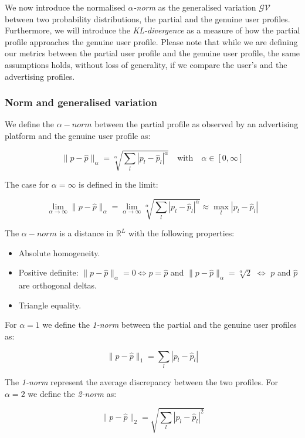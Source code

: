 We now introduce the normalised \emph{$\alpha$-norm} as the generalised variation $\mathcal{GV}$ between two probability distributions, the partial and the genuine user profiles. Furthermore, we will introduce the \emph{KL-divergence} as a measure of how the partial profile approaches the genuine user profile. Please note that while we are defining our metrics between the partial user profile and the genuine user profile, the same assumptions holds, without loss of generality, if we compare the user's and the advertising profiles.

\subsubsection{Norm and generalised variation}

We define the $\alpha-norm$ between the partial profile as observed by an advertising platform and the genuine user profile as:

$$ \| p - \hat{p} \|_\alpha = \sqrt[\alpha]{\sum_l{ {| p_l - \hat{p}_l |}^\alpha }} \quad  \text{with} \quad  \alpha \in [0, \infty] $$

The case for $\alpha = \infty$ is defined in the limit:

$$\lim_{\alpha\to\infty} \| p - \hat{p} \|_\alpha = \lim_{\alpha\to\infty} \sqrt[\alpha]{\sum_l{ {| p_l - \hat{p}_l |}^\alpha }} \approx \max_l { | p_l - \hat{p}_l | } $$

The $\alpha-norm$ is a distance in $\mathbb{R}^L$ with the following properties:

\begin{itemize}
 \item Absolute homogeneity.
 \item Positive definite: $ \| p - \hat{p} \|_\alpha = 0 \Leftrightarrow p = \hat{p} $ and $ \| p - \hat{p} \|_\alpha = \sqrt[\alpha]{2}$ $\Leftrightarrow$  $p$ and $\hat{p}$ are orthogonal deltas.
 \item Triangle equality.
\end{itemize}

For $\alpha = 1$ we define the \emph{1-norm} between the partial and the genuine user profiles as:

$$ \| p - \hat{p} \|_1 = \sum_l{ | p_{l} - \hat{p}_{l} | }  $$

The \emph{1-norm} represent the average discrepancy between the two profiles. For $\alpha = 2$ we define the \emph{2-norm} as:

$$ \| p - \hat{p} \|_2 = \sqrt{\sum_l{ {| {p_{l} - \hat{p}_{l}} |}^2 }} $$

